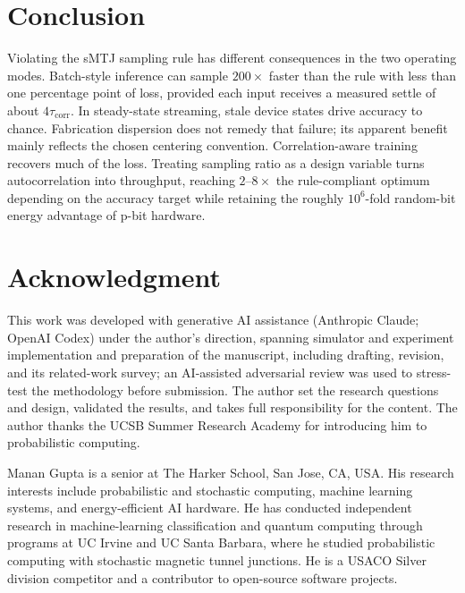 \documentclass{ieeeaccess}
\newcommand{\tauc}{\tau_{\mathrm{corr}}}
\begin{document}
\section{Conclusion}
Violating the sMTJ sampling rule has different consequences in the two
operating modes. Batch-style inference can sample $200\times$ faster than
the rule with less than one percentage point of loss, provided each input
receives a measured settle of about $4\tauc$. In steady-state streaming,
stale device states drive accuracy to chance. Fabrication dispersion does
not remedy that failure; its apparent benefit mainly reflects the chosen
centering convention. Correlation-aware training recovers much of the loss.
Treating sampling ratio as a design variable turns autocorrelation into
throughput, reaching $2$--$8\times$ the rule-compliant optimum depending on
the accuracy target while retaining the roughly $10^6$-fold random-bit
energy advantage of p-bit hardware.

\section*{Acknowledgment}
This work was developed with generative AI assistance (Anthropic Claude;
OpenAI Codex) under the author's direction, spanning simulator and
experiment implementation and preparation of the manuscript, including
drafting, revision, and its related-work survey; an AI-assisted
adversarial review was used to stress-test the methodology before
submission. The author set the research questions and design, validated
the results, and takes full responsibility for the content. The author
thanks the UCSB Summer Research Academy for introducing him to
probabilistic computing.




\begin{IEEEbiographynophoto}{Manan Gupta}
is a senior at The Harker School, San Jose, CA, USA. His research
interests include probabilistic and stochastic computing, machine
learning systems, and energy-efficient AI hardware. He has conducted
independent research in machine-learning classification and quantum
computing through programs at UC Irvine and UC Santa Barbara, where he
studied probabilistic computing with stochastic magnetic tunnel
junctions. He is a USACO Silver division competitor and a contributor to
open-source software projects.
\end{IEEEbiographynophoto}

\EOD
\end{document}

